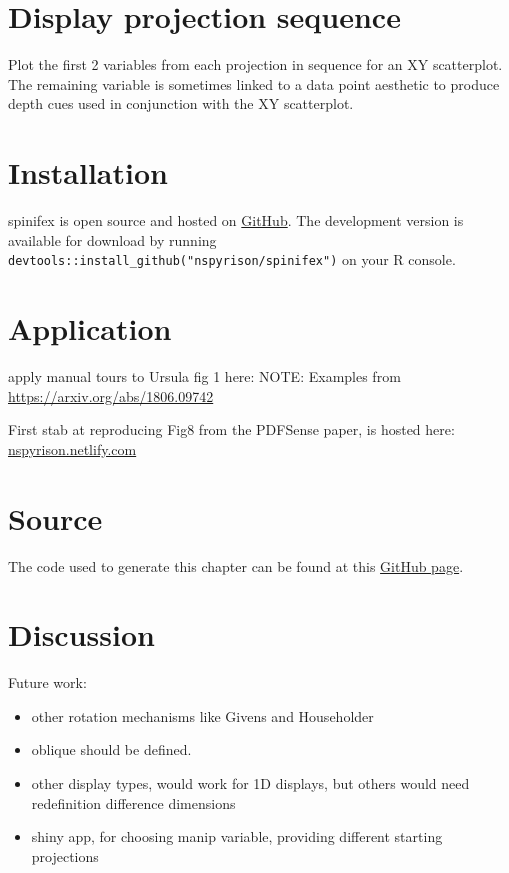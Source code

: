 \documentclass{monashthesis}
\begin{document}
\section{Display projection sequence}\label{display-projection-sequence}

Plot the first 2 variables from each projection in sequence for an XY
scatterplot. The remaining variable is sometimes linked to a data point
aesthetic to produce depth cues used in conjunction with the XY
scatterplot.

\section{Installation}\label{installation}

spinifex is open source and hosted on
\href{https://github.com/nspyrison/spinifex}{GitHub}. The development
version is available for download by running
\texttt{devtools::install\_github("nspyrison/spinifex")} on your R
console.

\section{Application}\label{application}

apply manual tours to Ursula fig 1 here: NOTE: Examples from
\url{https://arxiv.org/abs/1806.09742}

First stab at reproducing Fig8 from the PDFSense paper, is hosted here:
\href{https://nspyrison.netlify.com/else/pdfsense_fig8repex/}{nspyrison.netlify.com}

\section{Source}\label{source}

The code used to generate this chapter can be found at this
\href{https://github.com/nspyrison/Confirmation/blob/master/03-spinifex.Rmd}{GitHub
page}.

\section{Discussion}\label{discussion}

Future work:

\begin{itemize}
\tightlist
\item
  other rotation mechanisms like Givens and Householder
\item
  oblique should be defined.
\item
  other display types, would work for 1D displays, but others would need
  redefinition difference dimensions
\item
  shiny app, for choosing manip variable, providing different starting
  projections
\end{itemize}
\end{document}
